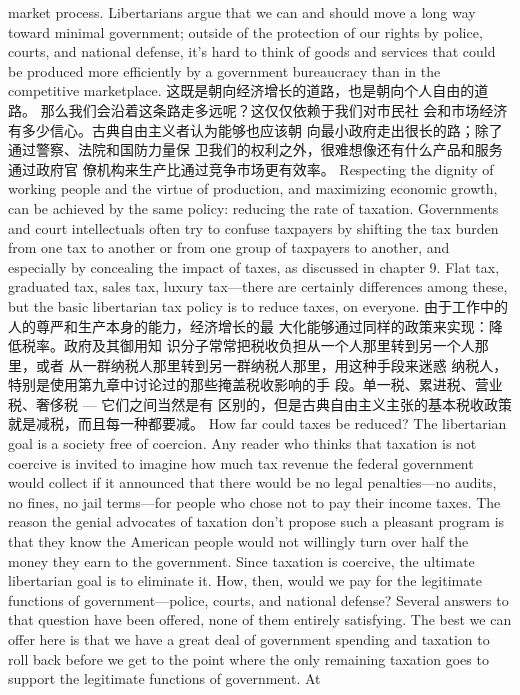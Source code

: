 \begin{paracol}{2}
market process. Libertarians argue that we can and should
move a long way toward minimal government; outside of the
protection of our rights by police, courts, and national defense,
it's hard to think of goods and services that could be produced
more efficiently by a government bureaucracy than in the competitive marketplace.
\switchcolumn
这既是朝向经济增长的道路，也是朝向个人自由的道路。
那么我们会沿着这条路走多远呢？这仅仅依赖于我们对市民社
会和市场经济有多少信心。古典自由主义者认为能够也应该朝
向最小政府走出很长的路；除了通过警察、法院和国防力量保
卫我们的权利之外，很难想像还有什么产品和服务通过政府官
僚机构来生产比通过竞争市场更有效率。
\switchcolumn*
Respecting the dignity of working people and the virtue of
production, and maximizing economic growth, can be
achieved by the same policy: reducing the rate of taxation.
Governments and court intellectuals often try to confuse taxpayers by shifting the tax burden from one tax to another or
from one group of taxpayers to another, and especially by concealing the impact of taxes, as discussed in chapter 9. Flat tax,
graduated tax, sales tax, luxury tax---there are certainly differences among these, but the basic libertarian tax policy is to reduce taxes, on everyone.
\switchcolumn
由于工作中的人的尊严和生产本身的能力，经济增长的最
大化能够通过同样的政策来实现：降低税率。政府及其御用知
识分子常常把税收负担从一个人那里转到另一个人那里，或者
从一群纳税人那里转到另一群纳税人那里，用这种手段来迷惑
纳税人，特别是使用第九章中讨论过的那些掩盖税收影响的手
段。单一税、累进税、营业税、奢侈税 --- 它们之间当然是有
区别的，但是古典自由主义主张的基本税收政策就是减税，而且每一种都要减。
\switchcolumn*
How far could taxes be reduced? The libertarian goal is a society free of coercion. Any reader who thinks that taxation is
not coercive is invited to imagine how much tax revenue the
federal government would collect if it announced that there
would be no legal penalties---no audits, no fines, no jail
terms---for people who chose not to pay their income taxes.
The reason the genial advocates of taxation don't propose such
a pleasant program is that they know the American people
would not willingly turn over half the money they earn to the
government. Since taxation is coercive, the ultimate libertarian
goal is to eliminate it. How, then, would we pay for the legitimate functions of government---police, courts, and national defense? Several answers to that question have been offered, none
of them entirely satisfying. The best we can offer here is that we have a great deal of government spending and taxation to roll
back before we get to the point where the only remaining taxation goes to support the legitimate functions of government. At

\end{paracol}
